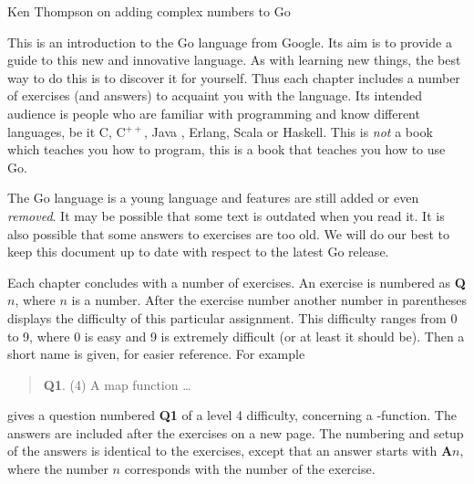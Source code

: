 {Ken Thompson on adding complex numbers to Go}

\noindent{}This is an introduction to the Go language from Google. Its aim
is to provide a guide to this new and innovative language. As with
learning new things, the best way to do this is to discover it for
yourself. Thus each chapter includes a number of exercises (and answers)
to acquaint you with the language.
Its intended audience is people who are familiar with programming
and know different languages, be it C\cite{c}, C$^{++}$\cite{c++}, 
Java \cite{java}, Erlang\cite{erlang}, Scala\cite{scala} or
Haskell\cite{haskell}. This is \emph{not} a book which teaches you how to 
program, this is a book that teaches you how to use Go.

\begin{lbar}
\noindent{}The Go language is a young language and
features are still added or even \emph{removed}. It 
may be possible that some text is outdated when you
read it. It is also
possible that some answers to exercises are
too old. We will do our best to keep this document up to 
date with respect to the latest Go release.
\end{lbar}

Each chapter concludes with a number of exercises. An exercise
is numbered as \textbf{Q$n$}, where $n$ is a number. After the
exercise number another number in parentheses displays the difficulty
of this particular assignment. This difficulty ranges from 0 to 9, where
0 is easy and 9 is extremely difficult (or at least it should be).
Then a short name is given, for easier reference.
For example
\begin{verse}
\textbf{Q1}. (4) A map function \ldots
\end{verse}
    
\noindent gives a question numbered \textbf{Q1} of a level 4 difficulty, concerning a
-function. The answers are included after the exercises on a
new page.
The numbering and setup of the answers is identical to the
exercises, except that an answer starts with \textbf{A$n$}, where the
number $n$ corresponds with the number of the exercise.

